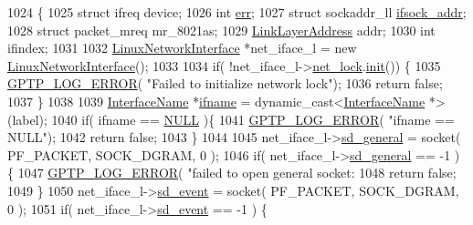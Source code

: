 \begin{DoxyCode}
1024                                    \{
1025     \textcolor{keyword}{struct }ifreq device;
1026     \textcolor{keywordtype}{int} \hyperlink{gst__avb__playbin_8c_a6ce68847c12434f60d1b2654a3dc3409}{err};
1027     \textcolor{keyword}{struct }sockaddr\_ll \hyperlink{gst__avb__playbin_8c_af0b4c4a7922dea9c701e7f3a813467e6}{ifsock\_addr};
1028     \textcolor{keyword}{struct }packet\_mreq mr\_8021as;
1029     \hyperlink{class_link_layer_address}{LinkLayerAddress} addr;
1030     \textcolor{keywordtype}{int} ifindex;
1031 
1032     \hyperlink{class_linux_network_interface}{LinuxNetworkInterface} *net\_iface\_l = \textcolor{keyword}{new} 
      \hyperlink{class_linux_network_interface}{LinuxNetworkInterface}();
1033 
1034     \textcolor{keywordflow}{if}( !net\_iface\_l->\hyperlink{class_linux_network_interface_a2485d8ad81138164119a9e8b68642a1d}{net\_lock}.\hyperlink{class_ticketing_lock_aee8048628ff2b5c026c9e15acdcaacb8}{init}()) \{
1035         \hyperlink{gptp__log_8hpp_afefbb1009717c128012bfeed94842987}{GPTP\_LOG\_ERROR}( \textcolor{stringliteral}{"Failed to initialize network lock"});
1036         \textcolor{keywordflow}{return} \textcolor{keyword}{false};
1037     \}
1038 
1039     \hyperlink{class_interface_name}{InterfaceName} *\hyperlink{aaf-talker_8c_ac7b430acaa92a7a26fbcdad47d2efc20}{ifname} = \textcolor{keyword}{dynamic\_cast<}\hyperlink{class_interface_name}{InterfaceName} *\textcolor{keyword}{>}(label);
1040     \textcolor{keywordflow}{if}( ifname == \hyperlink{openavb__types__base__pub_8h_a070d2ce7b6bb7e5c05602aa8c308d0c4}{NULL} )\{
1041         \hyperlink{gptp__log_8hpp_afefbb1009717c128012bfeed94842987}{GPTP\_LOG\_ERROR}( \textcolor{stringliteral}{"ifname == NULL"});
1042         \textcolor{keywordflow}{return} \textcolor{keyword}{false};
1043     \}
1044 
1045     net\_iface\_l->\hyperlink{class_linux_network_interface_a4dac986db2725a7381738a799374da65}{sd\_general} = socket( PF\_PACKET, SOCK\_DGRAM, 0 );
1046     \textcolor{keywordflow}{if}( net\_iface\_l->\hyperlink{class_linux_network_interface_a4dac986db2725a7381738a799374da65}{sd\_general} == -1 ) \{
1047         \hyperlink{gptp__log_8hpp_afefbb1009717c128012bfeed94842987}{GPTP\_LOG\_ERROR}( \textcolor{stringliteral}{"failed to open general socket: %
1048         \textcolor{keywordflow}{return} \textcolor{keyword}{false};
1049     \}
1050     net\_iface\_l->\hyperlink{class_linux_network_interface_ab2e41169dafb40e1ab917422a2d1145a}{sd\_event} = socket( PF\_PACKET, SOCK\_DGRAM, 0 );
1051     \textcolor{keywordflow}{if}( net\_iface\_l->\hyperlink{class_linux_network_interface_ab2e41169dafb40e1ab917422a2d1145a}{sd\_event} == -1 ) \{
}
\end{DoxyCode}
